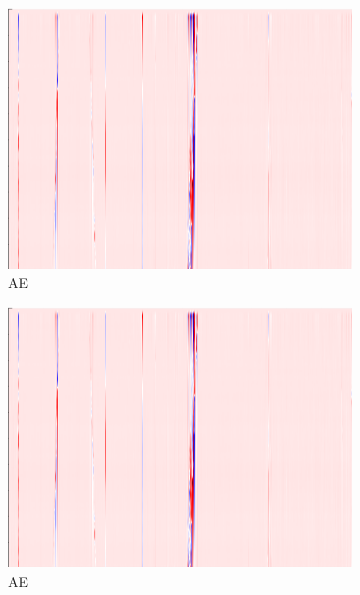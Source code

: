 \begin{figure}[h]
    \begin{subfigure}{0.33\textwidth}
        \includegraphics[width=\textwidth]{figures/test.png}
        \caption{AE}
    \end{subfigure}%
    \hfill
    \begin{subfigure}{0.33\textwidth}
        \includegraphics[width=\textwidth]{figures/test.png}
        \caption{AE}
    \end{subfigure}%
    \hfill
    \begin{subfigure}{0.33\textwidth}

\end{subfigure}
\end{figure}
